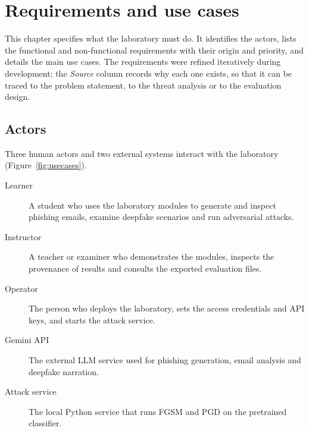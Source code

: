 \chapter{Requirements and use cases}
\label{cha:req}

This chapter specifies what the laboratory must do. It identifies the actors, lists the functional and non-functional requirements with their origin and priority, and details the main use cases. The requirements were refined iteratively during development; the \emph{Source} column records why each one exists, so that it can be traced to the problem statement, to the threat analysis or to the evaluation design.

\section{Actors}
\label{sec:actors}

Three human actors and two external systems interact with the laboratory (Figure~\ref{fig:usecases}).

\begin{description}
\item[Learner] A student who uses the laboratory modules to generate and inspect phishing emails, examine deepfake scenarios and run adversarial attacks.
\item[Instructor] A teacher or examiner who demonstrates the modules, inspects the provenance of results and consults the exported evaluation files.
\item[Operator] The person who deploys the laboratory, sets the access credentials and API keys, and starts the attack service.
\item[Gemini API] The external LLM service used for phishing generation, email analysis and deepfake narration.
\item[Attack service] The local Python service that runs FGSM and PGD on the pretrained classifier.
\end{description}

